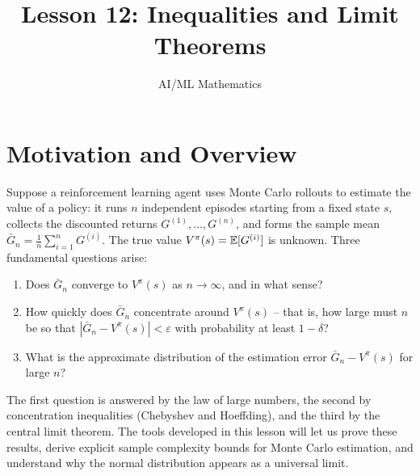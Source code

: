 \documentclass[11pt,a4paper]{article}
\title{Lesson 12: Inequalities and Limit Theorems}
\author{AI/ML Mathematics}
\date{}
\begin{document}
\maketitle
\tableofcontents
\newpage


\section{Motivation and Overview}
\label{sec:motivation}

Suppose a reinforcement learning agent uses Monte Carlo rollouts to estimate
the value of a policy: it runs $n$ independent episodes starting from a
fixed state $s$, collects the discounted returns
$G^{(1)}, \ldots, G^{(n)}$, and forms the sample mean
$\bar{G}_n = \frac{1}{n}\sum_{i=1}^n G^{(i)}$. The true value
$V^\pi(s) = \mathbb{E}[G^{(i)}]$ is unknown. Three fundamental questions arise:
\begin{enumerate}[nosep]
    \item Does $\bar{G}_n$ converge to $V^\pi(s)$ as $n \to \infty$,
    and in what sense?
    \item How quickly does $\bar{G}_n$ concentrate around $V^\pi(s)$ --
    that is, how large must $n$ be so that
    $|\bar{G}_n - V^\pi(s)| < \varepsilon$ with probability at least
    $1 - \delta$?
    \item What is the approximate distribution of the estimation error
    $\bar{G}_n - V^\pi(s)$ for large $n$?
\end{enumerate}
The first question is answered by the law of large numbers, the second by
concentration inequalities (Chebyshev and Hoeffding), and the third by the
central limit theorem. The tools developed in this lesson will let us
prove these results, derive explicit sample complexity bounds for Monte
Carlo estimation, and understand why the normal distribution appears as
a universal limit.
\end{document}
